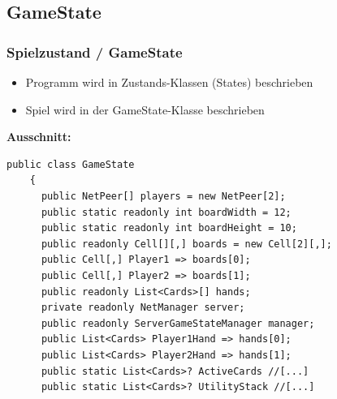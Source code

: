 \documentclass{beamer}
\begin{document}
\subsection{GameState}
\begin{frame}[fragile]
  \frametitle{Spielzustand / GameState}
  \begin{itemize}
    \item Programm wird in Zustands-Klassen (States) beschrieben
    \item Spiel wird in der GameState-Klasse beschrieben
  \end{itemize}
  \textbf{Ausschnitt: }
  \begin{lstlisting}[language=CSharp, basicstyle=\ttfamily\tiny, breaklines=true]
    public class GameState
    {
      public NetPeer[] players = new NetPeer[2];
      public static readonly int boardWidth = 12;
      public static readonly int boardHeight = 10;
      public readonly Cell[][,] boards = new Cell[2][,];
      public Cell[,] Player1 => boards[0];
      public Cell[,] Player2 => boards[1];
      public readonly List<Cards>[] hands;
      private readonly NetManager server;
      public readonly ServerGameStateManager manager;
      public List<Cards> Player1Hand => hands[0];
      public List<Cards> Player2Hand => hands[1];
      public static List<Cards>? ActiveCards //[...]
      public static List<Cards>? UtilityStack //[...]
  \end{lstlisting}
\end{frame}
\end{document}
